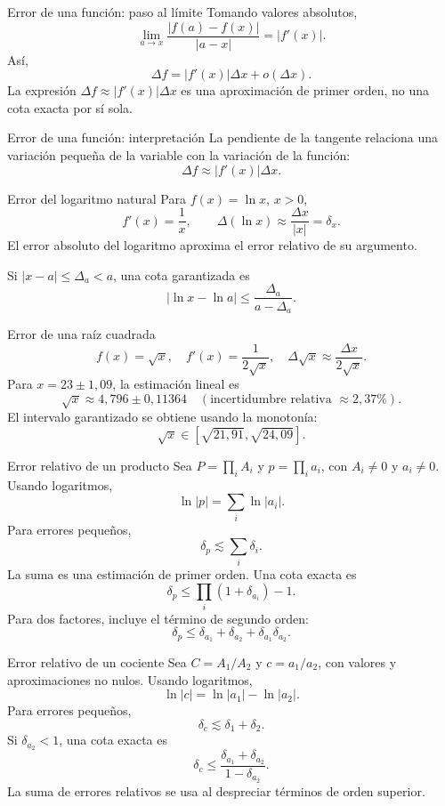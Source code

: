 \documentclass[original_version/main.tex]{subfiles}
\begin{document}
\begin{frame}{Error de una función: paso al límite}
Tomando valores absolutos,\[\lim_{a\to x}\frac{|f(a)-f(x)|}{|a-x|}=|f\prime(x)|.\]Así,\[\boxed{\Delta f=|f\prime(x)|\Delta x+o(\Delta x).}\]La expresión $\Delta f\approx|f\prime(x)|\Delta x$ es una aproximación de primer orden, no una cota exacta por sí sola.
\end{frame}

\begin{frame}{Error de una función: interpretación}
La pendiente de la tangente relaciona una variación pequeña de la variable con la variación de la función:\[\Delta f\approx|f\prime(x)|\Delta x.\]
\end{frame}

\begin{frame}{Error del logaritmo natural}
\small Para $f(x)=\ln x$, $x>0$,\[f\prime(x)=\frac1x,\qquad\Delta(\ln x)\approx\frac{\Delta x}{|x|}=\delta_x.\]El error absoluto del logaritmo aproxima el error relativo de su argumento.\par\medskip Si $|x-a|\le\Delta_a<a$, una cota garantizada es\[|\ln x-\ln a|\le\frac{\Delta_a}{a-\Delta_a}.\]
\end{frame}

\begin{frame}{Error de una raíz cuadrada}
\small\[f(x)=\sqrt x,\quad f\prime(x)=\frac1{2\sqrt x},\quad\Delta\sqrt x\approx\frac{\Delta x}{2\sqrt x}.\]Para $x=23\pm1{,}09$, la estimación lineal es\[\sqrt x\approx4{,}796\pm0{,}11364\quad(\text{incertidumbre relativa }\approx2{,}37\%).\]El intervalo garantizado se obtiene usando la monotonía:\[\sqrt x\in[\sqrt{21{,}91},\sqrt{24{,}09}].\]
\end{frame}

\begin{frame}{Error relativo de un producto}
\small Sea $P=\prod_i A_i$ y $p=\prod_i a_i$, con $A_i\ne0$ y $a_i\ne0$. Usando logaritmos,
\[\ln|p|=\sum_i\ln|a_i|.\]Para errores pequeños,\[\delta_p\lesssim\sum_i\delta_i.\]La suma es una estimación de primer orden. Una cota exacta es\[\boxed{\delta_p\le\prod_i(1+\delta_{a_i})-1.}\]Para dos factores, incluye el término de segundo orden:\[\delta_p\le\delta_{a_1}+\delta_{a_2}+\delta_{a_1}\delta_{a_2}.\]
\end{frame}

\begin{frame}{Error relativo de un cociente}
\small Sea $C=A_1/A_2$ y $c=a_1/a_2$, con valores y aproximaciones no nulos. Usando logaritmos,
\[\ln|c|=\ln|a_1|-\ln|a_2|.\]Para errores pequeños,\[\delta_c\lesssim\delta_1+\delta_2.\]Si $\delta_{a_2}<1$, una cota exacta es\[\boxed{\delta_c\le\frac{\delta_{a_1}+\delta_{a_2}}{1-\delta_{a_2}}.}\]La suma de errores relativos se usa al despreciar términos de orden superior.
\end{frame}
\end{document}

